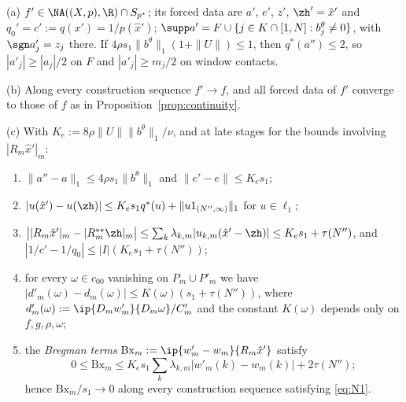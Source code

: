 \begin{lemma}\label{lem:approxfacts}
\textup{(a)} $f'\in\NA((X,p),\R)\cap S_{p^*}$; its forced data are $a'$,
$e'$, $z'$, $\zh'=\hat x'$ and $q_0'=c':=q(x')=1/p(\hat x')$;
$\supp a'=F\cup\{j\in K\cap[1,N]:b^\theta_j\ne0\}$, with $\sgn a'_j=z_j$
there.  If $4\rho s_1\|b^\theta\|_1(1+\|U\|)\le1$, then $q^*(a'')\le2$, so
$|a'_j|\ge|a_j|/2$ on $F$ and $|a'_j|\ge m_j/2$ on window contacts.

\textup{(b)} Along every construction sequence $f'\to f$, and all forced data
of $f'$ converge to those of $f$ as in Proposition~\ref{prop:continuity}.

\textup{(c)} With $K_e:=8\rho\|U\|\|b^\theta\|_1/\nu$, and at late stages
for the bounds involving $|R_m\hat x'|_m$:
\begin{enumerate}
\item[(E1)] $\|a''-a\|_1\le4\rho s_1\|b^\theta\|_1$ and $\|e'-e\|\le K_es_1$;
\item[(E2)] $|u(\hat x')-u(\zh)|\le K_es_1q^*(u)+\|u1_{(N'',\infty)}\|_1$ for
$u\in\ell_1$;
\item[(E3)] $\big||R_m\hat x'|_m-|R_m^{**}\zh|_m\big|\le\sum_k\lambda_{k,m}
|u_{k,m}(\hat x'-\zh)|\le K_es_1+\tau(N'')$, and
$|1/c'-1/q_0|\le|I|(K_es_1+\tau(N''))$;
\item[(E4)] for every $\omega\in c_{00}$ vanishing on $P_m\cup P'_m$ we
have $|d'_m(\omega)-d_m(\omega)|\le K(\omega)(s_1+\tau(N''))$, where
$d'_m(\omega):=\ip{D_mw'_m}{D_m\omega}/C'_m$ and the constant $K(\omega)$
depends only on $f,g,\rho,\omega$;
\item[(E5)] the \emph{Bregman terms} $\mathrm{Bx}_m:=\ip{w'_m-w_m}{R_m\hat x'}$
satisfy
\[
 0\le\mathrm{Bx}_m\le K_es_1\sum_k\lambda_{k,m}|w'_m(k)-w_m(k)|+2\tau(N'');
\]
hence $\mathrm{Bx}_m/s_1\to0$ along every construction
sequence satisfying \eqref{eq:N1}.
\end{enumerate}
\end{lemma}

